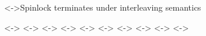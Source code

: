 
\begin{frame}{\onslide<\fScheme->{Spinlock terminates under interleaving semantics}}
  
  \unselect
  \only<\fRepI->{\selectI {}}  
  \only<\fCASI->{}
  \only<\fRepII->{\selectII {}}
  \only<\fCASII->{}
  \only<\fRepIIs->{}
  \only<\fCASIIs->{}
  \only<\fWI->{\selectI {}}
  \only<\fRepIIt->{\selectII {}}
  \only<\fCASIIt->{}
  \only<\fWII->{}


  \begin{columns}

    \begin{column}{0.5\linewidth}
      \spinlockClientIIExpandedIter


\end{column}
\end{columns}
\end{frame}
